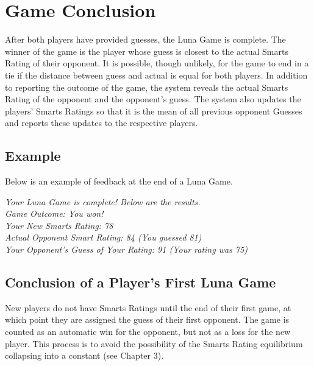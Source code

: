 \section{Game Conclusion}

After both players have provided guesses, the Luna Game is complete. The winner of the game is the player whose guess is closest to the actual Smarts Rating of their opponent. It is possible, though unlikely, for the game to end in a tie if the distance between guess and actual is equal for both players. In addition to reporting the outcome of the game, the system reveals the actual Smarts Rating of the opponent and the opponent's guess. The system also updates the players' Smarts Ratings so that it is the mean of all previous opponent Guesses and reports these updates to the respective players. 

\subsection{Example}
Below is an example of feedback at the end of a Luna Game.
\begin{center}
\textit{Your Luna Game is complete! Below are the results.}\\
\textit{Game Outcome: You won!}\\
\textit{Your New Smarts Rating: 78}\\
\textit{Actual Opponent Smart Rating: 84 (You guessed 81)}\\
\textit{Your Opponent's Guess of Your Rating: 91 (Your rating was 75)}
\end{center}

\subsection{Conclusion of a Player's First Luna Game}

New players do not have Smarts Ratings until the end of their first game, at which point they are assigned the guess of their first opponent. The game is counted as an automatic win for the opponent, but not as a loss for the new player. This process is to avoid the possibility of the Smarts Rating equilibrium collapsing into a constant (see Chapter 3).